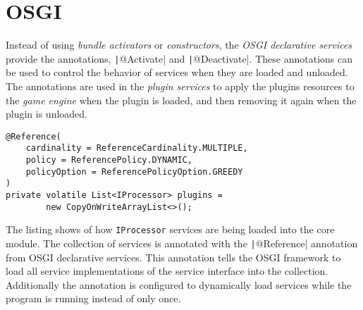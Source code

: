 \section{OSGI}

Instead of using \emph{bundle activators} or \emph{constructors}, 
the \emph{OSGI declarative services} provide the annotations, 
\texttt|@Activate| and \texttt|@Deactivate|.
These annotations can be used to control the behavior of services when they
are loaded and unloaded.
The annotations are used in the \emph{plugin services} to apply the plugins
resources to the \emph{game engine} when the plugin is loaded, 
and then removing it again when the plugin is unloaded.

\begin{listing}
\begin{verbatim}
@Reference(
    cardinality = ReferenceCardinality.MULTIPLE,
    policy = ReferencePolicy.DYNAMIC,
    policyOption = ReferencePolicyOption.GREEDY
)
private volatile List<IProcessor> plugins = 
        new CopyOnWriteArrayList<>();
\end{verbatim}

\caption{The listing shows of how \texttt{IProcessor} services are being loaded
into the core module.
The collection of services is annotated with the \texttt|@Reference|
annotation from OSGI declarative services.
This annotation tells the OSGI framework to load all service implementations of
the service interface into the collection.
Additionally the annotation is configured to dynamically load services while
the program is running instead of only once.
}
\label{lst:osgi-ref}
\end{listing}